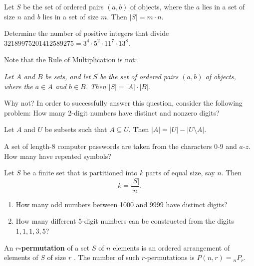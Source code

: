 \begin{theorem} Let $S$ be the set of ordered pairs $(a, b)$ of objects, where the $a$ lies in a set of size $n$ and $b$ lies in a set of size $m$.  Then $|S| = m \cdot n$.
\end{theorem}

\begin{example} Determine the number of positive integers that divide $32189975201412589275 = 3^4 \cdot 5^2 \cdot 11^7 \cdot 13^8$.
\end{example}

\begin{question} Note that the Rule of Multiplication is not:

    \textit{Let $A$ and $B$ be sets, and let $S$ be the set of ordered pairs $(a, b)$ of objects, where the $a\in A$ and $b \in B$.  Then $|S| = |A| \cdot |B|$.}

    Why not?  In order to successfully answer this question, consider the following problem: How many 2-digit numbers have distinct and nonzero digits?
\end{question}

\begin{theorem} Let $A$ and $U$ be subsets such that $A \subseteq U$.  Then $|A| = |U| - |U\setminus A|$.
\end{theorem}

\begin{example} A set of length-8 computer passwords are taken from the characters 0-9 and $a$-$z$. How many have repeated symbols?
\end{example}

\begin{theorem} Let $S$ be a finite set that is partitioned into $k$ parts of equal size, say $n$.  Then $$k = \frac{|S|}{n}.$$
\end{theorem}

\begin{examples}\leavevmode
\begin{enumerate}
    \item How many odd numbers between 1000 and 9999 have distinct digits?
    \item How many different 5-digit numbers can be constructed from the digits $1, 1, 1, 3, 5$?
\end{enumerate}
\end{examples}

\begin{definition} An \textbf{$r$-permutation} of a set $S$ of $n$ elements is an ordered arrangement of elements of $S$ of size $r$ .  The number of such $r$-permutations is $P(n, r) = {}_n P_r$.
\end{definition}

